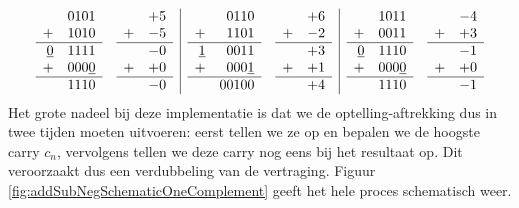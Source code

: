 \begin{equation}
\begin{array}{rl|rl|rl}
\begin{array}{rr}
&0101\\
+&1010\\\hline
\underline{0}&1111\\
+&000\underline{0}\\\hline
&1110
\end{array}
&
\begin{array}{rr}
&+5\\
+&-5\\\hline
&-0\\
+&+0\\\hline
&-0
\end{array}
&
\begin{array}{rr}
&0110\\
+&1101\\\hline
\underline{1}&0011\\
+&000\underline{1}\\\hline
&00100
\end{array}
&
\begin{array}{rr}
&+6\\
+&-2\\\hline
&+3\\
+&+1\\\hline
&+4
\end{array}
&
\begin{array}{rr}
&1011\\
+&0011\\\hline
\underline{0}&1110\\
+&000\underline{0}\\\hline
&1110
\end{array}
&
\begin{array}{rr}
&-4\\
+&+3\\\hline
&-1\\
+&+0\\\hline
&-1
\end{array}
\end{array}
\label{eqn:oneComplementCorrectExample}
\end{equation}
Het grote nadeel bij deze implementatie is dat we de optelling-aftrekking dus in twee tijden moeten uitvoeren: eerst tellen we ze op en bepalen we de hoogste carry $c_n$, vervolgens tellen we deze carry nog eens bij het resultaat op. Dit veroorzaakt dus een verdubbeling van de vertraging. Figuur \ref{fig:addSubNegSchematicOneComplement} geeft het hele proces schematisch weer.
